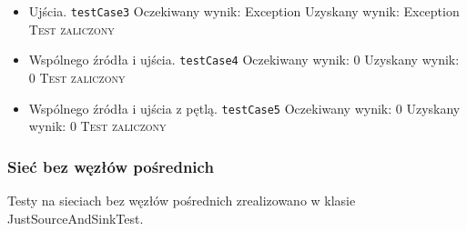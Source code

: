 \begin{itemize}[nosep]
    \item Ujścia.
    \texttt{testCase3}
    Oczekiwany wynik: Exception
    Uzyskany wynik: Exception
    \textsc{Test zaliczony}

    \item Wspólnego źródła i ujścia.
    \texttt{testCase4}
    Oczekiwany wynik: 0
    Uzyskany wynik: 0
    \textsc{Test zaliczony}

    \item Wspólnego źródła i ujścia z pętlą.
    \texttt{testCase5}
    Oczekiwany wynik: 0
    Uzyskany wynik: 0
    \textsc{Test zaliczony}
\end{itemize}


\subsubsection{Sieć bez węzłów pośrednich}
Testy na sieciach bez węzłów pośrednich zrealizowano w klasie JustSourceAndSinkTest.
